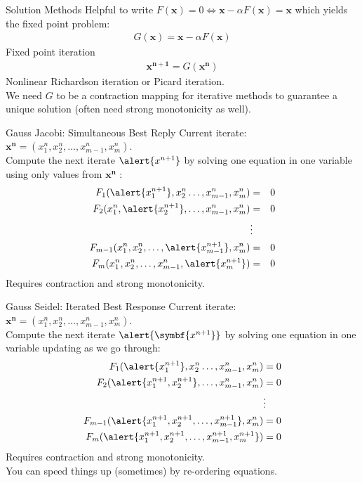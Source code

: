 \begin{frame}{Solution Methods}
Helpful to write $F(\symbf{x}) = 0 \Leftrightarrow \symbf{x} - \alpha F(\symbf{x}) = \symbf{x}$ which yields the fixed point problem:
\begin{eqnarray*}
G(\symbf{x}) = \symbf{x} -\alpha F(\symbf{x})
\end{eqnarray*}
Fixed point iteration
\begin{eqnarray*}
\symbf{x^{n+1}} = G(\symbf{x^n})
\end{eqnarray*}
Nonlinear Richardson iteration or Picard iteration.\\
\vspace{0.5cm}
We need $G$ to be a \alert{contraction mapping} for iterative methods to guarantee a unique solution (often need strong monotonicity as well).
\end{frame} 

\begin{frame}{Gauss Jacobi: Simultaneous Best Reply}
Current iterate: $\symbf{x^n} = (x_1^n,x_2^n,\ldots,x_{m-1}^n,x_m^n)$.\\
\vspace{0.5cm}
Compute the next iterate $\alert{x^{n+1}}$ by solving one equation in one variable using only values from $\symbf{x^n}$ : 
\begin{eqnarray*}
F_1 (\alert{x_1^{n+1}},x_2^n \ldots, x_{m-1}^n, x_m^n)  &=& 0 \\
F_2  (x_1^n,\alert{x_2^{n+1}},\ldots,x_{m-1}^n,x_m^n)  &=& 0\\
&\vdots&\\ 
F_{m-1}  (x_1^n,x_2^n,\ldots,\alert{x_{m-1}^{n+1}},x_m^n)  &=& 0\\
F_m  (x_1^n,x_2^n,\ldots,x_{m-1}^n, \alert{x_m^{n+1}})  &=& 0
\end{eqnarray*}
Requires contraction and strong monotonicity.
\end{frame} 

\begin{frame}{Gauss Seidel: Iterated Best Response}
Current iterate: $\symbf{x^n} = (x_1^n,x_2^n,\ldots,x_{m-1}^n,x_m^n)$.\\
\vspace{0.5cm}
Compute the next iterate $\alert{\symbf{x^{n+1}}}$ by solving one equation in one variable updating as we go through:
\begin{align*}
F_1 (\alert{x_1^{n+1}},x_2^n \ldots, x_{m-1}^n, x_m^n)  &= 0 \\
F_2  (\alert{x_1^{n+1},x_2^{n+1}},\ldots,x_{m-1}^n,x_m^n)  &= 0\\
&\vdots\\ 
F_{m-1}  (\alert{x_1^{n+1},x_2^{n+1},\ldots,x_{m-1}^{n+1}},x_m^n)  &= 0\\
F_m (\alert{x_1^{n+1},x_2^{n+1},\ldots,x_{m-1}^{n+1}, x_m^{n+1}})  &= 0
\end{align*}
Requires contraction and strong monotonicity.\\
You can speed things up (sometimes) by re-ordering equations.

\end{frame} 

